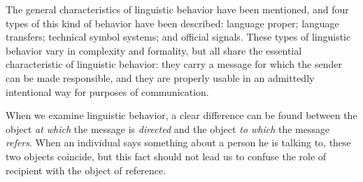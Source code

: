 \documentclass[openany,nobib]{tufte-book}
\begin{document}
The general characteristics of linguistic behavior have been mentioned,
and four types of this kind of behavior have been described: language
proper; language transfers; technical symbol systems; and official
signals. These types of linguistic behavior vary in complexity and
formality, but all share the essential characteristic of linguistic
behavior: they carry a message for which the sender can be made
responsible, and they are properly usable in an admittedly intentional
way for purposes of communication.

When we examine linguistic behavior, a clear difference can be found
between the object \emph{at which} the message is \emph{directed} and
the object \emph{to which} the message \emph{refers}. When an individual
says something about a person he is talking to, these two objects
coincide, but this fact should not lead us to confuse the role of
recipient with the object of reference.
\end{document}
